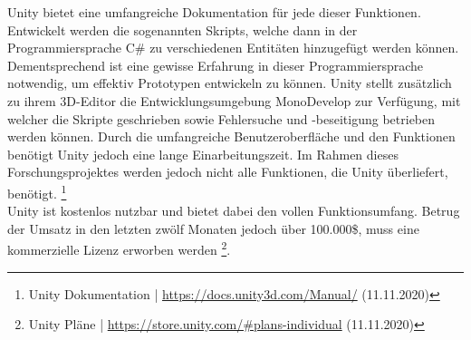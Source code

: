 \documentclass[a4paper,12pt,oneside]{article}
\begin{document}
        Unity bietet eine umfangreiche Dokumentation für jede dieser Funktionen.
        Entwickelt werden die sogenannten Skripts, welche dann in der Programmiersprache
        C\# zu verschiedenen Entitäten hinzugefügt werden können. Dementsprechend ist eine
        gewisse Erfahrung in dieser Programmiersprache notwendig, um effektiv Prototypen
        entwickeln zu können. 
        Unity stellt zusätzlich zu ihrem 3D-Editor die 
        Entwicklungsumgebung MonoDevelop zur Verfügung, mit welcher die Skripte 
        geschrieben sowie Fehlersuche und -beseitigung betrieben werden können.
        Durch die umfangreiche Benutzeroberfläche und den Funktionen benötigt Unity jedoch 
        eine lange Einarbeitungszeit. 
        Im Rahmen dieses Forschungsprojektes werden jedoch nicht alle Funktionen,
        die Unity überliefert, benötigt.
        \footnote{Unity Dokumentation | \url{https://docs.unity3d.com/Manual/} (11.11.2020)}
        \\
        Unity ist kostenlos nutzbar und bietet dabei den vollen Funktionsumfang. Betrug der
        Umsatz in den letzten zwölf Monaten jedoch über 100.000\$, muss eine kommerzielle
        Lizenz erworben werden \footnote{Unity Pläne | \url{https://store.unity.com/\#plans-individual} (11.11.2020)}.
\end{document}
